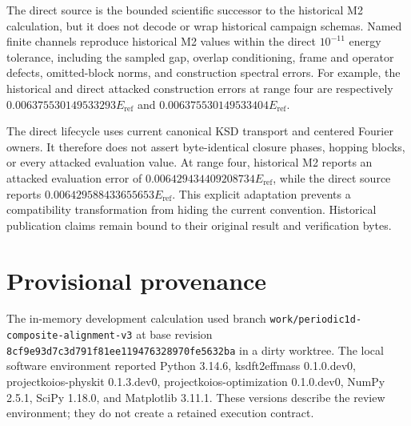\documentclass[11pt]{article}
\newcommand{\eref}{E_{\mathrm{ref}}}
\begin{document}
The direct source is the bounded scientific successor to the historical M2 calculation,
but it does not decode or wrap historical campaign schemas.  Named finite channels
reproduce historical M2 values within the direct $10^{-11}$ energy tolerance, including
the sampled gap, overlap conditioning, frame and operator defects, omitted-block norms,
and construction spectral errors.  For example, the historical and direct attacked
construction errors at range four are respectively
$0.006375530149533293\eref$ and $0.006375530149533404\eref$.

The direct lifecycle uses current canonical KSD transport and centered Fourier owners.
It therefore does not assert byte-identical closure phases, hopping blocks, or every
attacked evaluation value.  At range four, historical M2 reports an attacked evaluation
error of $0.006429434409208734\eref$, while the direct source reports
$0.006429588433655653\eref$.  This explicit adaptation prevents a compatibility
transformation from hiding the current convention.  Historical publication claims
remain bound to their original result and verification bytes.

\section{Provisional provenance}

The in-memory development calculation used branch
\nolinkurl{work/periodic1d-composite-alignment-v3} at base revision
\nolinkurl{8cf9e93d7c3d791f81ee119476328970fe5632ba} in a dirty worktree.  The local
software environment reported Python 3.14.6, ksdft2effmass 0.1.0.dev0,
projectkoios-physkit 0.1.3.dev0, projectkoios-optimization 0.1.0.dev0, NumPy 2.5.1,
SciPy 1.18.0, and Matplotlib 3.11.1.  These versions describe the review environment;
they do not create a retained execution contract.
\end{document}
